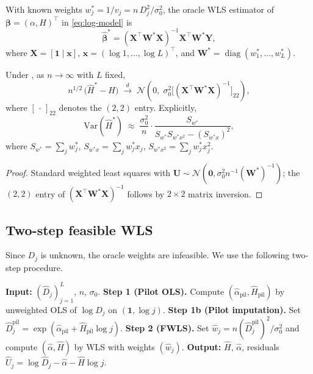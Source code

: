 \documentclass[10pt,a4paper,twocolumn]{article}
\newcommand{\Var}{\mathrm{Var}}
\newcommand{\dto}{\xrightarrow{d}}
\newcommand{\Dhj}{\widehat{D}_j}
\newcommand{\Hhat}{\widehat{H}}
\newcommand{\calN}{\mathcal{N}}
\DeclareMathOperator{\diag}{diag}
\begin{document}
With known weights $w_j^* = 1/v_j = n\,D_j^2/\sigma_0^2$, the oracle
WLS estimator of $\boldsymbol{\beta} = (\alpha, H)^\top$ in
\eqref{eq:log-model} is
\begin{equation}
    \boldsymbol{\hat\beta}^* = (\mathbf{X}^\top \mathbf{W}^* \mathbf{X})^{-1}
    \mathbf{X}^\top \mathbf{W}^* \mathbf{Y},
    \label{eq:oracle-wls}
\end{equation}
where $\mathbf{X} = [\mathbf{1}\mid \mathbf{x}]$, $\mathbf{x} = (\log
1, \ldots, \log L)^\top$, and $\mathbf{W}^* = \diag(w_1^*, \ldots, w_L^*)$.

\begin{proposition}
\label{prop:oracle-clt}
Under , as $n \to \infty$ with $L$
fixed,
\[
    n^{1/2}\,\bigl(\hat H^* - H\bigr) \;\dto\; \calN\!\left(0,\;
    \sigma_0^2 \bigl[(\mathbf{X}^\top \mathbf{W}^* \mathbf{X})^{-1}\bigr]_{22}\right),
\]
where $[\,\cdot\,]_{22}$ denotes the $(2,2)$ entry.
Explicitly,
\begin{equation}
    \Var(\hat H^*) \;\approx\; \frac{\sigma_0^2}{n}
    \cdot \frac{S_{w^*}}
    {S_{w^*} S_{w^* x^2} - (S_{w^* x})^2},
    \label{eq:oracle-var}
\end{equation}
where $S_{w^*} = \sum_j w_j^*$, $S_{w^* x} = \sum_j w_j^* x_j$,
$S_{w^* x^2} = \sum_j w_j^* x_j^2$.
\end{proposition}

\begin{proof}
Standard weighted least squares with $\mathbf{U} \sim
\calN(\mathbf{0}, \sigma_0^2 n^{-1} (\mathbf{W}^*)^{-1})$; the
$(2,2)$ entry of $(\mathbf{X}^\top \mathbf{W}^* \mathbf{X})^{-1}$ follows
by $2\times 2$ matrix inversion.
\end{proof}

\subsection{Two-step feasible WLS}

Since $D_j$ is unknown, the oracle weights are infeasible.  We use the
following two-step procedure.

\begin{algorithm}[H]
\caption{Two-Step FWLS Estimator}
\label{alg:fwls}
\begin{algorithmic}[1]
\State \textbf{Input:} $(\Dhj)_{j=1}^L$, $n$, $\sigma_0$.
\State \textbf{Step 1 (Pilot OLS).}  Compute
    $(\hat\alpha_{\mathrm{pil}}, \hat H_{\mathrm{pil}})$ by unweighted
    OLS of $\log \Dhj$ on $(\mathbf{1}, \log j)$.
\State \textbf{Step 1b (Pilot imputation).}  Set
    $\hat D_j^{\mathrm{pil}} = \exp(\hat\alpha_{\mathrm{pil}} +
    \hat H_{\mathrm{pil}} \log j)$.
\State \textbf{Step 2 (FWLS).}  Set $\hat w_j =
    n (\hat D_j^{\mathrm{pil}})^2 / \sigma_0^2$ and compute
    $(\hat\alpha, \Hhat)$ by WLS with weights $(\hat w_j)$.
\State \textbf{Output:} $\Hhat$, $\hat\alpha$, residuals
    $\hat U_j = \log \Dhj - \hat\alpha - \Hhat \log j$.
\end{algorithmic}
\end{algorithm}
\end{document}
